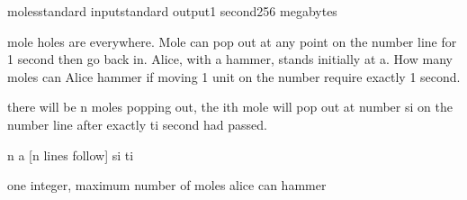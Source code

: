 \begin{problem}{moles}{standard input}{standard output}{1 second}{256 megabytes}

mole holes are everywhere. Mole can pop out at any point on the number line for 1 second then go back in. Alice, with a hammer, stands initially at a. How many moles can Alice hammer if moving 1 unit on the number require exactly 1 second.

there will be n moles popping out, the ith mole will pop out at number si on the number line after exactly ti second had passed.

\InputFile
n a
[n lines follow]
si ti

\OutputFile
one integer, maximum number of moles alice can hammer

\Examples

\begin{example}
%
%
\end{example}

\end{problem}

